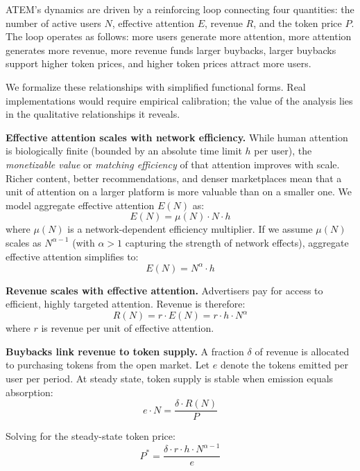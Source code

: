 \documentclass[12pt, a4paper]{article}
\begin{document}
ATEM's dynamics are driven by a reinforcing loop connecting four quantities: the number of active users $N$, effective attention $E$, revenue $R$, and the token price $P$. The loop operates as follows: more users generate more attention, more attention generates more revenue, more revenue funds larger buybacks, larger buybacks support higher token prices, and higher token prices attract more users.

We formalize these relationships with simplified functional forms. Real implementations would require empirical calibration; the value of the analysis lies in the qualitative relationships it reveals.

\textbf{Effective attention scales with network efficiency.} While human attention is biologically finite (bounded by an absolute time limit $h$ per user), the \emph{monetizable value} or \emph{matching efficiency} of that attention improves with scale. Richer content, better recommendations, and denser marketplaces mean that a unit of attention on a larger platform is more valuable than on a smaller one. We model aggregate effective attention $E(N)$ as:
\begin{equation}
E(N) = \mu(N) \cdot N \cdot h
\end{equation}
where $\mu(N)$ is a network-dependent efficiency multiplier. If we assume $\mu(N)$ scales as $N^{\alpha-1}$ (with $\alpha > 1$ capturing the strength of network effects), aggregate effective attention simplifies to:
\begin{equation}
E(N) = N^\alpha \cdot h
\label{eq:attention}
\end{equation}

\textbf{Revenue scales with effective attention.} Advertisers pay for access to efficient, highly targeted attention. Revenue is therefore:
\begin{equation}
R(N) = r \cdot E(N) = r \cdot h \cdot N^\alpha
\label{eq:revenue}
\end{equation}
where $r$ is revenue per unit of effective attention.

\textbf{Buybacks link revenue to token supply.} A fraction $\delta$ of revenue is allocated to purchasing tokens from the open market. Let $e$ denote the tokens emitted per user per period. At steady state, token supply is stable when emission equals absorption:
\begin{equation}
e \cdot N = \frac{\delta \cdot R(N)}{P}
\end{equation}

Solving for the steady-state token price:
\begin{equation}
P^* = \frac{\delta \cdot r \cdot h \cdot N^{\alpha-1}}{e}
\label{eq:price}
\end{equation}
\end{document}
